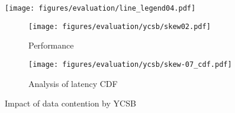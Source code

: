 \begin{figure}[]
    \centering
    \begin{minipage}{0.8\linewidth}
        \centering
        \texttt{[image: figures/evaluation/line\_legend04.pdf]}
        \vspace{-5mm}
    \end{minipage}
    \begin{minipage}{0.95\linewidth}
        \centering
        \begin{subfigure}{0.46\linewidth}
            \texttt{[image: figures/evaluation/ycsb/skew02.pdf]}
            \vspace{-6mm}
            \caption{Performance}
            \label{fig:ycsb.contention}
        \end{subfigure}
        \begin{subfigure}{0.46\linewidth}
            \texttt{[image: figures/evaluation/ycsb/skew-07\_cdf.pdf]}
            \vspace{-6mm}
            \caption{Analysis of latency CDF}
            \label{fig:ycsb.skew.cdf.09}
        \end{subfigure}
    \end{minipage}

    \vspace{-4mm}
    \caption{Impact of data contention by YCSB}
    \label{fig:evaluation.contention.ycsb.cdf}
    \vspace{-4mm}
\end{figure}

